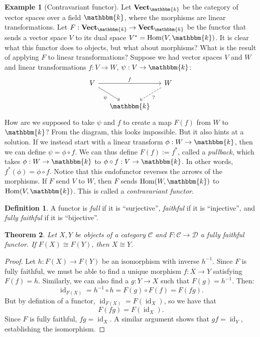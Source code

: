 \documentclass[12pt]{book}
\theoremstyle{definition}
\newtheorem{definition}{Definition}[section]
\newtheorem{defexample}{Example}[definition]
\theoremstyle{plain}
\newtheorem{theorem}[definition]{Theorem}
\theoremstyle{definition}
\DeclareMathOperator{\id}{id}
\DeclareMathOperator{\Hom}{Hom}
\begin{document}
\begin{defexample}[Contravariant functor]
  Let $\mathbf{Vect}_\mathbbm{k}$ be the category of vector spaces over a field $\mathbbm{k}$, where the morphisms are linear transformations. Let $F : \mathbf{Vect}_\mathbbm{k} \rightarrow \mathbf{Vect}_\mathbbm{k}$ be the functor that sends a vector space $V$ to its dual space $V^* = \Hom(V, \mathbbm{k})$. It is clear what this functor does to objects, but what about morphisms? What is the result of applying $F$ to linear transformations? Suppose we had vector spaces $V$ and $W$ and linear transformations $f : V \rightarrow W$, $\psi : V \rightarrow \mathbbm{k}$:
  \[\begin{tikzcd}[column sep=small]
    V \arrow[swap]{dr}{\psi} \arrow{rr}{f} & & W \arrow[dl, dashrightarrow, "?"] \\
    & \mathbbm{k}
  \end{tikzcd}\]
  How are we supposed to take $\psi$ and $f$ to create a map $F(f)$ from $W$ to $\mathbbm{k}$? From the diagram, this looks impossible. But it also hints at a solution. If we instead start with a linear transform $\phi : W \rightarrow \mathbbm{k}$, then we can define $\psi = \phi \circ f$. We can thus define $F(f) := f^*$, called a \emph{pullback}, which takes $\phi : W \rightarrow \mathbbm{k}$ to $\phi \circ f : V \rightarrow \mathbbm{k}$. In other words, $f^*(\phi) = \phi \circ f$. Notice that this endofunctor reverses the arrows of the morphisms. If $F$ send $V$ to $W$, then $F$ sends $\Hom(W, \mathbbm{k})$ to $\Hom(V, \mathbbm{k})$. This is called a \emph{contravariant functor}.
\end{defexample}

\begin{definition}
  A functor is \emph{full} if it is ``surjective'', \emph{faithful} if it is ``injective'', and \emph{fully faithful} if it is ``bijective''.
\end{definition}

\begin{theorem}
  Let $X, Y$ be objects of a category $\mathscr{C}$ and $F : \mathscr{C} \rightarrow \mathscr{D}$ a fully faithful functor. If $F(X) \cong F(Y)$, then $X \cong Y$.
\end{theorem}

\begin{proof}
  Let $h : F(X) \rightarrow F(Y)$ be an isomorphism with inverse $h^{-1}$. Since $F$ is fully faithful, we must be able to find a unique morphism $f : X \rightarrow Y$ satisfying $F(f) = h$. Similarly, we can also find a $g : Y \rightarrow X$ such that $F(g) = h^{-1}$. Then:
  \[\id_{F(X)} = h^{-1} \circ h = F(g) \circ F(f) = F(fg).\]
  But by defintion of a functor, $\id_{F(X)} = F(\id_X)$, so we have that
  \[F(fg) = F(\id_X).\]
  Since $F$ is fully faithful, $fg = \id_X$. A similar argument shows that $gf = \id_Y$, establishing the isomorphism.
\end{proof}
\end{document}
